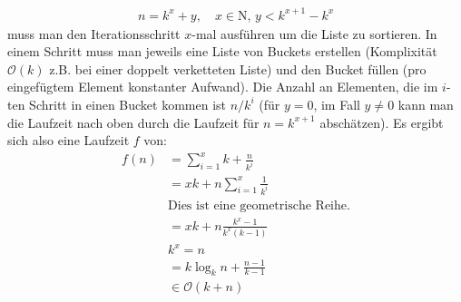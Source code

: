 \documentclass[11pt]{article}
\begin{document}
\begin{enumerate}[a)]
      \begin{align*}
        n = k^x + y, \quad x \in \mathrm{N}, \, y < k^{x + 1} - k^x
      \end{align*}
      muss man den Iterationsschritt $x$-mal ausführen um die Liste zu
      sortieren. In einem Schritt muss man jeweils eine Liste von Buckets
      erstellen (Komplixität $\mathcal{O}(k)$ z.B. bei einer doppelt verketteten
      Liste) und den Bucket füllen (pro eingefügtem Element konstanter Aufwand).
      Die Anzahl an Elementen, die im $i$-ten Schritt in einen Bucket kommen ist
      $n/k^i$ (für $y = 0$, im Fall $y \neq 0$ kann man die Laufzeit nach oben
      durch die Laufzeit für $n = k^{x + 1}$ abschätzen). Es ergibt sich also
      eine Laufzeit $f$ von:
      \begin{align*}
        f(n) &= \sum_{i = 1}^x k + \frac{n}{k^i} \\
        &= x k + n \sum_{i = 1}^x \frac{1}{k^i} \\
        &\text{Dies ist eine geometrische Reihe.} \\
        &= x k + n \frac{k^x - 1}{k^x (k - 1)} \\
        &k^x = n \\
        &= k \log_k n + \frac{n - 1}{k - 1} \\
        &\in \mathcal{O}(k + n)
      \end{align*}
  \end{enumerate}
\end{document}
